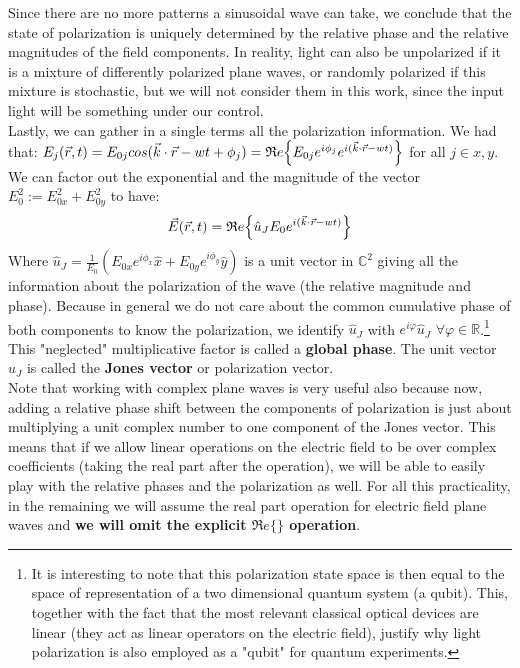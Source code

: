 \documentclass[11pt, a4paper, twoside]{article} %
\newcommand{\R}{\mathbb{R}} %
\newcommand{\C}{\mathbb{C}}
\DeclareRobustCommand{\mybox}[2][gray!10]{%
\begin{tcolorbox}[   %
        left=0.2cm,
        right=0.2cm,
        top=0.15cm,
        bottom=0.15cm,
        colback=#1,
        colframe=#1,
        width=\dimexpr\textwidth\relax, 
        enlarge left by=0mm,
        boxsep=5pt,
        arc=0pt,outer arc=0pt,
        ]
        #2
\end{tcolorbox}
}
\begin{document}
\mybox{ Since there are no more patterns a sinusoidal wave can take, we conclude that the state of polarization is uniquely determined by the relative phase and the relative magnitudes of the field components. In reality, light can also be unpolarized if it is a mixture of differently polarized plane waves, or randomly polarized if this mixture is stochastic, but we will not consider them in this work, since the input light will be something under our control.\vspace{-0.1cm}\\

 Lastly, we can gather in a single terms all the polarization information. We had that: $E_j(\vec{r},t)=E_{0j}cos(\vec{k}\cdot\vec{r}-wt+\phi_j)=\mathfrak{R}e\qty{E_{0j}e^{i\phi_j}e^{i(\vec{k}\cdot\vec{r}-wt)}}$ for all $j\in{x,y}$. We can factor out the exponential and the magnitude of the vector $E_0^2:=E_{0x}^2+E_{0y}^2$ to have:\vspace{-0.1cm}
\begin{equation}
\vec{E}(\vec{r},t)=\mathfrak{R}e\qty{\hat{u}_JE_0e^{i(\vec{k}\cdot\vec{r}-wt)} }\vspace{-0.1cm}
\end{equation}
Where $\hat{u}_J=\frac{1}{E_0}(E_{0x}e^{i\phi_x}\hat{x}+E_{0y}e^{i\phi_y}\hat{y})$ is a unit vector in $\C^2$ giving all the information about the polarization of the wave (the relative magnitude and phase). Because in general we do not care about the common cumulative phase of both components to know the polarization, we identify $\hat{u}_J$ with $e^{i\varphi}\hat{u}_J$ $\forall 	\varphi\in\R$.\footnote{It is interesting to note that this polarization state space is then equal to the space of representation of a two dimensional quantum system (a qubit). This, together with the fact that the most relevant classical optical devices are linear (they act as linear operators on the electric field), justify why light polarization is also employed as a "qubit" for quantum experiments.} This "neglected" multiplicative factor is called a {\bf global phase}. The unit vector $\hat{u}_J$ is called the {\bf Jones vector} or polarization vector.\vspace{-0.1cm}\\

Note that working with complex plane waves is very useful also because now, adding a relative phase shift between the components of polarization is just about multiplying a unit complex number to one component of the Jones vector. This means that if we allow linear operations on the electric field to be over complex coefficients (taking the real part after the operation), we will be able to easily play with the relative phases and the polarization as well. For all this practicality, in the remaining we will assume the real part operation for electric field plane waves and {\bf we will omit the explicit $\mathfrak{R}e\{\}$ operation}.
}\vspace{-0.5cm}
\end{document}
